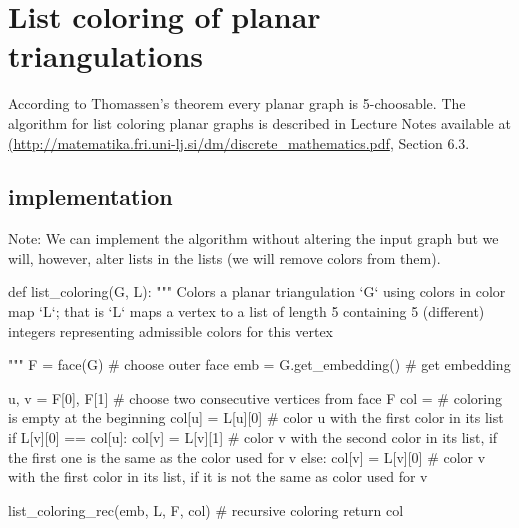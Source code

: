 \chapter{List coloring of planar triangulations}

According to Thomassen's theorem every planar graph is 5-choosable. The algorithm for list coloring planar graphs is described in Lecture Notes available at \url{(http://matematika.fri.uni-lj.si/dm/discrete_mathematics.pdf}, Section 6.3.

\section{implementation}

Note: We can implement the algorithm without altering the input graph but we will, however, alter lists in the lists (we will remove colors from them).

\begin{sageCell}
def list_coloring(G, L):
    """
    Colors a planar triangulation `G` using colors in color map `L`; that is `L` maps a vertex to a list of length 5 containing
    5 (different) integers representing admissible colors for this vertex

    """
    F = face(G)  # choose outer face
    emb = G.get_embedding()  # get embedding

    u, v = F[0], F[1]  # choose two consecutive vertices from face F
    col = {}  # coloring is empty at the beginning
    col[u] = L[u][0]  # color u with the first color in its list
    if L[v][0] == col[u]:
        col[v] = L[v][1]  # color v with the second color in its list, if the first one is the same as the color used for v
    else:
        col[v] = L[v][0]  # color v with the first color in its list, if it is not the same as color used for v

    list_coloring_rec(emb, L, F, col)  # recursive coloring
    return col
\end{sageCell}

